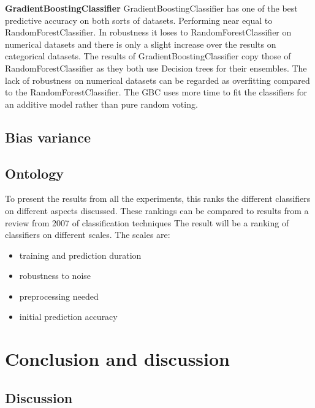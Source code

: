 \documentclass[a4paper,10pt]{article}
\begin{document}
\textbf{GradientBoostingClassifier} GradientBoostingClassifier has one of the best predictive accuracy on both sorts of datasets. Performing near equal to RandomForestClassifier. In robustness it loses to RandomForestClassifier on numerical datasets and there is only a slight increase over the results on categorical datasets. The results of GradientBoostingClassifier copy those of RandomForestClassifier as they both use Decision trees for their ensembles. The lack of robustness on numerical datasets can be regarded as overfitting compared to the RandomForestClassifier. The GBC uses more time to fit the classifiers for an additive model rather than pure random voting.\\


\subsection{Bias variance}


\subsection{Ontology}
To present the results from all the experiments, this ranks the different classifiers on different aspects discussed.
These rankings can be compared to results from a review from 2007 of classification techniques \cite{RevClass}
The result will be a ranking of classifiers on different scales. The scales are:
\begin{itemize}
	\item training and prediction duration
	\item robustness to noise
	\item preprocessing needed
	\item initial prediction accuracy
\end{itemize} 








\newpage
\section{Conclusion and discussion} \label{Chapter5}

\subsection{Discussion}
\end{document}
